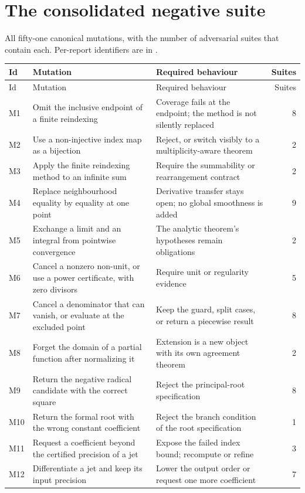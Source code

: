 \documentclass[11pt,a4paper]{article}
\newcommand{\code}[1]{\texttt{\detokenize{#1}}}
\theoremstyle{definition}
\begin{document}
\section{The consolidated negative suite}\label{app:suite}
All fifty-one canonical mutations, with the number of adversarial suites that contain each. Per-report identifiers are in \code{negative_suite.csv}.

\begingroup\footnotesize
\begin{longtable}{@{}L{8mm}L{58mm}L{72mm}r@{}}
\toprule
Id & Mutation & Required behaviour & Suites\\
\midrule
\endfirsthead
\toprule
Id & Mutation & Required behaviour & Suites\\
\midrule
\endhead
M1 & Omit the inclusive endpoint of a finite reindexing & Coverage fails at the endpoint; the method is not silently replaced & 8\\
M2 & Use a non-injective index map as a bijection & Reject, or switch visibly to a multiplicity-aware theorem & 2\\
M3 & Apply the finite reindexing method to an infinite sum & Require the summability or rearrangement contract & 2\\
M4 & Replace neighbourhood equality by equality at one point & Derivative transfer stays open; no global smoothness is added & 9\\
M5 & Exchange a limit and an integral from pointwise convergence & The analytic theorem's hypotheses remain obligations & 2\\
M6 & Cancel a nonzero non-unit, or use a power certificate, with zero divisors & Require unit or regularity evidence & 5\\
M7 & Cancel a denominator that can vanish, or evaluate at the excluded point & Keep the guard, split cases, or return a piecewise result & 8\\
M8 & Forget the domain of a partial function after normalizing it & Extension is a new object with its own agreement theorem & 2\\
M9 & Return the negative radical candidate with the correct square & Reject the principal-root specification & 8\\
M10 & Return the formal root with the wrong constant coefficient & Reject the branch condition of the root specification & 1\\
M11 & Request a coefficient beyond the certified precision of a jet & Expose the failed index bound; recompute or refine & 3\\
M12 & Differentiate a jet and keep its input precision & Lower the output order or request one more coefficient & 7\\

\end{longtable}
\end{document}
